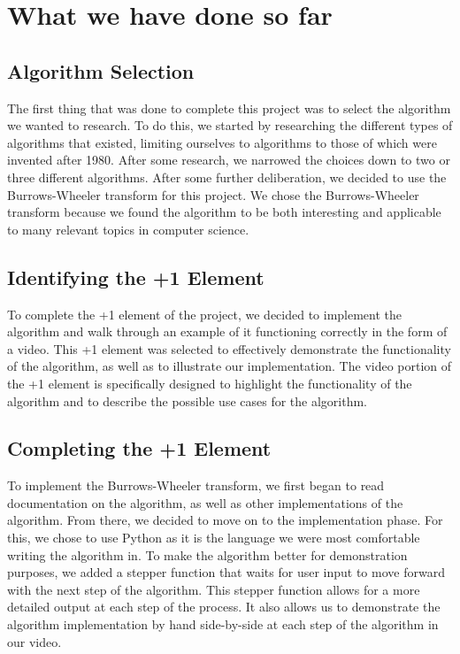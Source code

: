 \documentclass{article}
\begin{document}
   \section{What we have done so far}
   
   \subsection{Algorithm Selection}
   The first thing that was done to complete this project was to select the algorithm we wanted to research. To do this, we started by researching the different types of algorithms that existed, limiting ourselves to algorithms to those of which were invented after 1980. After some research, we narrowed the choices down to two or three different algorithms. After some further deliberation, we decided to use the Burrows-Wheeler transform for this project. We chose the Burrows-Wheeler transform because we found the algorithm to be both interesting and applicable to many relevant topics in computer science.
   
   \subsection{Identifying the +1 Element}
   To complete the +1 element of the project, we decided to implement the algorithm and walk through an example of it functioning correctly in the form of a video. This +1 element was selected to effectively demonstrate the functionality of the algorithm, as well as to illustrate our implementation. The video portion of the +1 element is specifically designed to highlight the functionality of the algorithm and to describe the possible use cases for the algorithm.
   
   \subsection{Completing the +1 Element}
   To implement the Burrows-Wheeler transform, we first began to read documentation on the algorithm, as well as other implementations of the algorithm. From there, we decided to move on to the implementation phase. For this, we chose to use Python as it is the language we were most comfortable writing the algorithm in. To make the algorithm better for demonstration purposes, we added a stepper function that waits for user input to move forward with the next step of the algorithm. This stepper function allows for a more detailed output at each step of the process. It also allows us to demonstrate the algorithm implementation by hand side-by-side at each step of the algorithm in our video.
   
\end{document}
